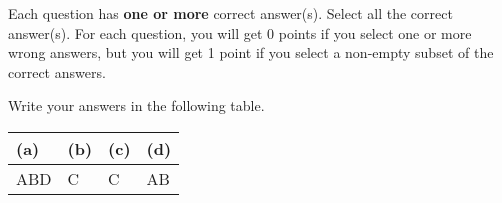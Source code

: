 Each question has \textbf{one or more} correct answer(s). Select all the correct answer(s). For each question, you will get 0 points if you select one or more wrong answers, but you will get 1 point if you select a non-empty subset of the correct answers.

Write your answers in the following table.

\begin{table}[htbp]
  \centering
  \begin{tabular}{|p{2cm}|p{2cm}|p{2cm}|p{2cm}|}
    \hline
    (a) & (b) & (c) & (d) \\
    \hline
      ABD  &  C   &  C   &   AB  \\
    \hline
  \end{tabular}
\end{table}

